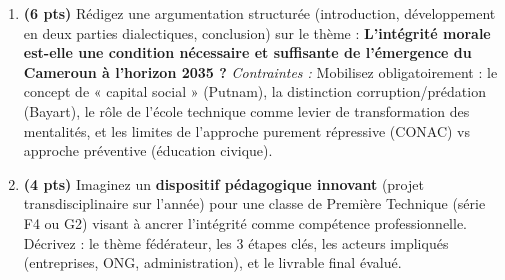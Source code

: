 \documentclass[11pt]{article}
\begin{document}
\begin{exercice}
\begin{enumerate}
    \item \textbf{(6 pts)} Rédigez une argumentation structurée (introduction, développement en deux parties dialectiques, conclusion) sur le thème : \og \textbf{L'intégrité morale est-elle une condition nécessaire et suffisante de l'émergence du Cameroun à l'horizon 2035 ?} \fg
    \textit{Contraintes :} Mobilisez obligatoirement : le concept de « capital social » (Putnam), la distinction corruption/prédation (Bayart), le rôle de l'école technique comme levier de transformation des mentalités, et les limites de l'approche purement répressive (CONAC) vs approche préventive (éducation civique).
    \item \textbf{(4 pts)} Imaginez un \textbf{dispositif pédagogique innovant} (projet transdisciplinaire sur l'année) pour une classe de Première Technique (série F4 ou G2) visant à ancrer l'intégrité comme compétence professionnelle. Décrivez : le thème fédérateur, les 3 étapes clés, les acteurs impliqués (entreprises, ONG, administration), et le livrable final évalué.
\end{enumerate}
\end{exercice}
\end{document}
